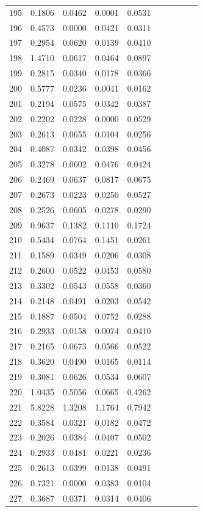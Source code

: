 \begin{table}
\begin{tabular}{cccccccccc}
195& 0.1806& 0.0462& 0.0001& 0.0531\\ 
196& 0.4573& 0.0000& 0.0421& 0.0311\\ 
197& 0.2954& 0.0620& 0.0139& 0.0410\\ 
198& 1.4710& 0.0617& 0.0464& 0.0897\\ 
199& 0.2815& 0.0340& 0.0178& 0.0366\\ 
200& 0.5777& 0.0236& 0.0041& 0.0162\\ 
201& 0.2194& 0.0575& 0.0342& 0.0387\\ 
202& 0.2202& 0.0228& 0.0000& 0.0529\\ 
203& 0.2613& 0.0655& 0.0104& 0.0256\\ 
204& 0.4087& 0.0342& 0.0398& 0.0456\\ 
205& 0.3278& 0.0602& 0.0476& 0.0424\\ 
206& 0.2469& 0.0637& 0.0817& 0.0675\\ 
207& 0.2673& 0.0223& 0.0250& 0.0527\\ 
208& 0.2526& 0.0605& 0.0278& 0.0290\\ 
209& 0.9637& 0.1382& 0.1110& 0.1724\\ 
210& 0.5434& 0.0764& 0.1451& 0.0261\\ 
211& 0.1589& 0.0349& 0.0206& 0.0308\\ 
212& 0.2600& 0.0522& 0.0453& 0.0580\\ 
213& 0.3302& 0.0543& 0.0558& 0.0360\\ 
214& 0.2148& 0.0491& 0.0203& 0.0542\\ 
215& 0.1887& 0.0504& 0.0752& 0.0288\\ 
216& 0.2933& 0.0158& 0.0074& 0.0410\\ 
217& 0.2165& 0.0673& 0.0566& 0.0522\\ 
218& 0.3620& 0.0490& 0.0165& 0.0114\\ 
219& 0.3081& 0.0626& 0.0534& 0.0607\\ 
220& 1.0435& 0.5056& 0.0665& 0.4262\\ 
221& 5.8228& 1.3208& 1.1764& 0.7942\\ 
222& 0.3584& 0.0321& 0.0182& 0.0472\\ 
223& 0.2026& 0.0384& 0.0407& 0.0502\\ 
224& 0.2933& 0.0481& 0.0221& 0.0236\\ 
225& 0.2613& 0.0399& 0.0138& 0.0491\\ 
226& 0.7321& 0.0000& 0.0383& 0.0104\\ 
227& 0.3687& 0.0371& 0.0314& 0.0406\\ 

\end{tabular}
\end{table}
